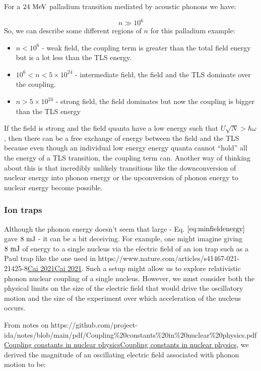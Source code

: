 \documentclass[
]{article}
\let\oldhref\href
\renewcommand{\href}[2]{\ifx#1\urlprefix\oldhref{#1}{#2}\else\uline{\oldhref{#1}{#2}}\fi}
\renewcommand{\[}{\begin{equation}}
\renewcommand{\]}{\end{equation}}
\providecommand{\tightlist}{%
  \setlength{\itemsep}{0pt}\setlength{\parskip}{0pt}}
\begin{document}
For a \(\rm 24 \ MeV\) palladium transition mediated by acoustic phonons
we have:

\[
n \gg 10^{6}
\] So, we can describe some different regions of \(n\) for this
palladium example:

\begin{itemize}
\tightlist
\item
  \(n<10^{6}\) - weak field, the coupling term is greater than the total
  field energy but is a lot less than the TLS energy.
\item
  \(10^6 < n < 5 \times 10^{24}\) - intermediate field, the field and
  the TLS dominate over the coupling.
\item
  \(n > 5\times 10^{24}\) - strong field, the field dominates but now
  the coupling is bigger than the TLS energy
\end{itemize}

If the field is strong and the field quanta have a low energy such that
\(U\sqrt{N}>\hbar\omega\), then there can be a free exchange of energy
between the field and the TLS because even though an individual low
energy energy quanta cannot ``hold'' all the energy of a TLS transition,
the coupling term can. Another way of thinking about this is that
incredibly unlikely transitions like the downconversion of nuclear
energy into phonon energy or the upconversion of phonon energy to
nuclear energy become possible.

\subsubsection{Ion traps}\label{ion-traps}

Although the phonon energy doesn't seem that large - Eq.
\(\ref{eq:minfieldenergy}\) gave \(8 \ \rm mJ\) - it can be a bit
deceiving. For example, one might imagine giving \(8 \ \rm mJ\) of
energy to a single nucleus via the electric field of an ion trap such as
a Paul trap like the one used in
\href{https://www.nature.com/articles/s41467-021-21425-8}{Cai 2021}.
Such a setup might allow us to explore relativistic phonon nuclear
coupling of a single nucleus. However, we must consider both the
physical limits on the size of the electric field that would drive the
oscillatory motion and the size of the experiment over which
acceleration of the nucleus occurs.

From notes on
\href{https://github.com/project-ida/notes/blob/main/pdf/Coupling\%20constants\%20in\%20nuclear\%20physics.pdf}{Coupling
constants in nuclear physics}, we derived the magnitude of an
oscillating electric field associated with phonon motion to be:
\end{document}
